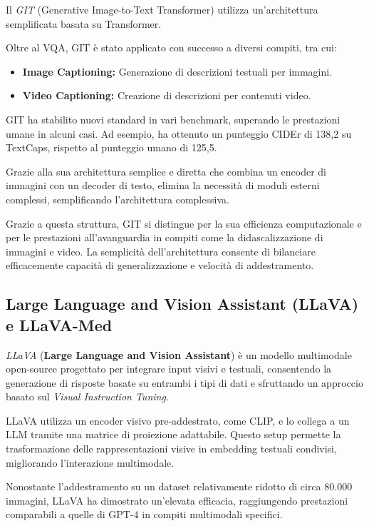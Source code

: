 \documentclass[../main.tex]{subfiles}
\begin{document}
Il \textit{GIT} (Generative Image-to-Text Transformer) \cite{wang2022gitgenerativeimagetotexttransformer} utilizza un'architettura semplificata basata su Transformer.

Oltre al VQA, GIT è stato applicato con successo a diversi compiti, tra cui:
\begin{itemize}
    \item \textbf{Image Captioning:} Generazione di descrizioni testuali per immagini.
    \item \textbf{Video Captioning:} Creazione di descrizioni per contenuti video.
\end{itemize}

GIT ha stabilito nuovi standard in vari benchmark, superando le prestazioni umane in alcuni casi. Ad esempio, ha ottenuto un punteggio CIDEr di 138,2 su TextCaps, rispetto al punteggio umano di 125,5.

Grazie alla sua architettura semplice e diretta che combina un encoder di immagini con un decoder di testo, elimina la necessità di moduli esterni complessi, semplificando l'architettura complessiva. 

Grazie a questa struttura, GIT si distingue per la sua efficienza computazionale e per le prestazioni all'avanguardia in compiti come la didascalizzazione di immagini e video. La semplicità dell'architettura consente di bilanciare efficacemente capacità di generalizzazione e velocità di addestramento.

\subsection{Large Language and Vision Assistant (LLaVA) e LLaVA-Med}

\textit{LLaVA} (\textbf{Large Language and Vision Assistant}) \cite{liu2023visualinstructiontuning} è un modello multimodale open-source progettato per integrare input visivi e testuali, consentendo la generazione di risposte basate su entrambi i tipi di dati e sfruttando un approccio basato sul \textit{Visual Instruction Tuning}.

LLaVA utilizza un encoder visivo pre-addestrato, come CLIP, e lo collega a un LLM tramite una matrice di proiezione adattabile. Questo setup permette la trasformazione delle rappresentazioni visive in embedding testuali condivisi, migliorando l'interazione multimodale.

Nonostante l'addestramento su un dataset relativamente ridotto di circa 80.000 immagini, LLaVA ha dimostrato un'elevata efficacia, raggiungendo prestazioni comparabili a quelle di GPT-4 in compiti multimodali specifici.
\end{document}
